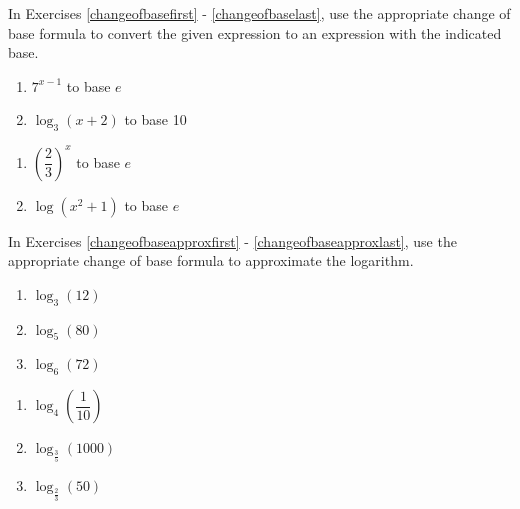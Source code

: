 \documentclass{ximera}
\begin{document}
In Exercises \ref{changeofbasefirst} - \ref{changeofbaselast}, use the appropriate change of base formula to convert the given expression to an expression with the indicated base. 

\begin{multicols}{2}
\begin{enumerate}
\setcounter{enumi}{\value{HW}}

\item $7^{x - 1}$ to base $e$ \label{changeofbasefirst}
\item $\log_{3}(x + 2)$ to base 10

\setcounter{HW}{\value{enumi}}
\end{enumerate}
\end{multicols}

\begin{multicols}{2}
\begin{enumerate}
\setcounter{enumi}{\value{HW}}

\item $\left(\dfrac{2}{3}\right)^{x}$ to base $e$
\item $\log(x^{2} + 1)$ to base $e$ \label{changeofbaselast}

\setcounter{HW}{\value{enumi}}
\end{enumerate}
\end{multicols}

\newpage

In Exercises \ref{changeofbaseapproxfirst} - \ref{changeofbaseapproxlast}, use the appropriate change of base formula to approximate the logarithm.

\begin{multicols}{3}
\begin{enumerate}
\setcounter{enumi}{\value{HW}}

\item $\log_{3}(12)$ \label{changeofbaseapproxfirst}
\item $\log_{5}(80)$
\item $\log_{6}(72)$

\setcounter{HW}{\value{enumi}}
\end{enumerate}
\end{multicols}

\begin{multicols}{3}
\begin{enumerate}
\setcounter{enumi}{\value{HW}}

\item $\log_{4}\left(\dfrac{1}{10}\right)$
\item $\log_{\frac{3}{5}}(1000)$ 
\item $\log_{\frac{2}{3}}(50)$  \label{changeofbaseapproxlast}

\setcounter{HW}{\value{enumi}}
\end{enumerate}
\end{multicols}
\end{document}
